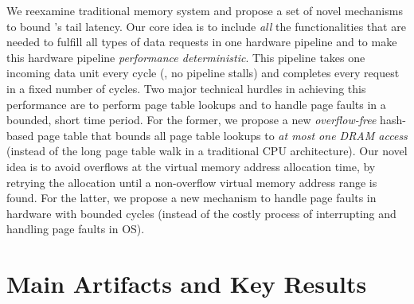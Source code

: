 We reexamine traditional memory system
and propose a set of novel mechanisms to bound \sys's tail latency.
Our core idea is to include {\em all} the functionalities that are needed to fulfill all types of data requests in one hardware pipeline
and to make this hardware pipeline {\em performance deterministic}.
This pipeline takes one incoming data unit every cycle (\ie, no pipeline stalls) and completes every request in a fixed number of cycles.
Two major technical hurdles in achieving this performance are to perform page table lookups and to handle page faults in a bounded, short time period.  
For the former, we propose a new {\em overflow-free} hash-based page table that bounds all page table lookups to {\em at most one DRAM access} (instead of the long page table walk in a traditional CPU architecture).
Our novel idea is to avoid overflows at the virtual memory address allocation time, by retrying the allocation until a non-overflow virtual memory address range is found.
For the latter, we propose a new mechanism to handle page faults in hardware with bounded cycles (instead of the costly process of interrupting and handling page faults in OS).


\section{Main Artifacts and Key Results}



